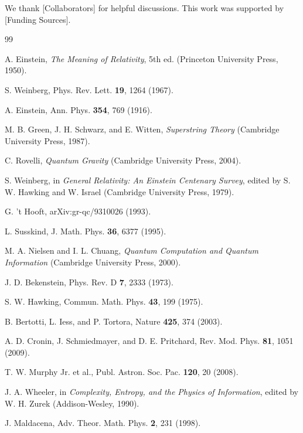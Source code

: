 \documentclass[twocolumn,prd,superscriptaddress,nofootinbib]{revtex4-2}
\begin{document}
\begin{acknowledgments}
We thank [Collaborators] for helpful discussions. This work was supported by [Funding Sources].
\end{acknowledgments}

\begin{thebibliography}{99}

 A. Einstein, \textit{The Meaning of Relativity}, 5th ed. (Princeton University Press, 1950).

 S. Weinberg, Phys. Rev. Lett. \textbf{19}, 1264 (1967).

 A. Einstein, Ann. Phys. \textbf{354}, 769 (1916).

 M. B. Green, J. H. Schwarz, and E. Witten, \textit{Superstring Theory} (Cambridge University Press, 1987).

 C. Rovelli, \textit{Quantum Gravity} (Cambridge University Press, 2004).

 S. Weinberg, in \textit{General Relativity: An Einstein Centenary Survey}, edited by S. W. Hawking and W. Israel (Cambridge University Press, 1979).

 G. 't Hooft, arXiv:gr-qc/9310026 (1993).

 L. Susskind, J. Math. Phys. \textbf{36}, 6377 (1995).

 M. A. Nielsen and I. L. Chuang, \textit{Quantum Computation and Quantum Information} (Cambridge University Press, 2000).

 J. D. Bekenstein, Phys. Rev. D \textbf{7}, 2333 (1973).

 S. W. Hawking, Commun. Math. Phys. \textbf{43}, 199 (1975).

 B. Bertotti, L. Iess, and P. Tortora, Nature \textbf{425}, 374 (2003).

 A. D. Cronin, J. Schmiedmayer, and D. E. Pritchard, Rev. Mod. Phys. \textbf{81}, 1051 (2009).

 T. W. Murphy Jr. et al., Publ. Astron. Soc. Pac. \textbf{120}, 20 (2008).

 J. A. Wheeler, in \textit{Complexity, Entropy, and the Physics of Information}, edited by W. H. Zurek (Addison-Wesley, 1990).

 J. Maldacena, Adv. Theor. Math. Phys. \textbf{2}, 231 (1998).

\end{thebibliography}
\end{document}
